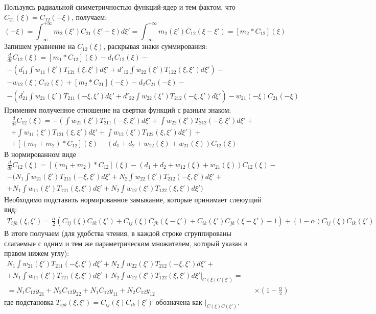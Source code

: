 Пользуясь радиальной симметричностью функций-ядер и тем фактом, что $C_{21}(\xi)=C_{12}(-\xi)$, получаем:
\begin{equation*}
[m_{2}*C_{21}](-\xi)=\int_{-\infty}^{+\infty}m_{2}(\xi')C_{21}(\xi'-\xi)d\xi'=\int_{-\infty}^{+\infty}m_{2}(\xi')C_{12}(\xi-\xi')=[m_{2}*C_{12}](\xi)
\end{equation*}
Запишем уравнение на $C_{12}(\xi)$, раскрывая знаки суммирования:
\begin{multline*}
\frac{d}{dt}C_{12}(\xi)=[m_{1}*C_{12}](\xi)-d_{1}C_{12}(\xi)-\\
-\left(d{}_{11}^{'}\int w_{11}(\xi')T_{121}(\xi,\xi')d\xi'+d'_{12}\int w_{22}(\xi')T_{122}(\xi,\xi')d\xi'\right)-\\
-w_{12}(\xi)C_{12}(\xi)+[m_{2}*C_{21}](-\xi)-d_{2}C_{21}(-\xi)-\\
-\left(d_{21}^{'}\int w_{21}(\xi')T_{211}(-\xi,\xi')d\xi'+d'_{22}\int w_{22}(\xi')T_{212}(-\xi,\xi')d\xi'\right)-w_{21}(-\xi)C_{21}(-\xi)
\end{multline*}
Применим полученное отношение на свертки функций с разным знаком:
\begin{multline*}
\frac{d}{dt}C_{12}(\xi)=-\left(\int w_{21}(\xi')T_{211}(-\xi,\xi')d\xi'+\int w_{22}(\xi')T_{212}(-\xi,\xi')d\xi'+\right.\\
\left.+\int w_{11}(\xi')T_{121}(\xi,\xi')d\xi'+\int w_{12}(\xi')T_{122}(\xi,\xi')d\xi'\right) + \\
+[(m_{1}+m_{2})*C_{12}](\xi)-(d_{1}+d_{2}+w_{12}(\xi)+w_{21}(\xi))C_{12}(\xi)
\end{multline*}
В нормированном виде 
\begin{multline*}
\frac{d}{dt}C_{12}(\xi)=[(m_{1}+m_{2})*C_{12}](\xi)-(d_{1}+d_{2}+w_{12}(\xi)+w_{21}(\xi))C_{12}(\xi)-\\
-(N_{1}\int w_{21}(\xi')T_{211}(-\xi,\xi')d\xi'+N_{2}\int w_{22}(\xi')T_{212}(-\xi,\xi')d\xi'+\\
+N_{1}\int w_{11}(\xi')T_{121}(\xi,\xi')d\xi'+N_{2}\int w_{12}(\xi')T_{122}(\xi,\xi')d\xi')
\end{multline*}
Необходимо подставить нормированное замыкание, которые принимает слеюущий вид:
\begin{multline*}
T_{ijk}(\xi,\xi')=\frac{\alpha}{2}(C_{ij}(\xi)C_{ik}(\xi')+C_{ij}(\xi)C_{jk}(\xi-\xi')+C_{ik}(\xi')C_{jk}(\xi-\xi')-1)+(1-\alpha)C_{ij}(\xi)C_{ik}(\xi')
\end{multline*}
В итоге получаем (для удобства чтения, в каждой строке сгруппированы слагаемые с одним и тем же параметрическим множителем, который указан в правом нижем углу):
\begin{align*}
N_{1}\int w_{21}(\xi')T_{211}(-\xi,\xi')d\xi'+N_{2}\int w_{22}(\xi')T_{212}(-\xi,\xi')d\xi'+		\\
+N_{1}\int w_{11}(\xi')T_{121}(\xi,\xi')d\xi'+N_{2}\int w_{12}(\xi')T_{122}(\xi,\xi')d\xi'	|_{C(\xi)C(\xi')}=	\\
=N_{1}C_{12}y_{21}+N_{2}C_{12}y_{22}+N_{1}C_{12}y_{11}+N_{2}C_{12}y_{12} &&		\times(1-\frac{\alpha}{2})
\end{align*}
где подстановка $T_{ijk}(\xi, \xi')=C_{ij}(\xi)C_{ik}(\xi')$ обозначена как 	$|_{C(\xi)C(\xi')}$.

